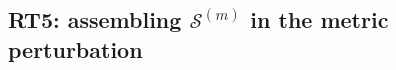 %

\subsection*{RT5: assembling \texorpdfstring{$\mathcal{S}^{(m)}$}{S(m)} in the metric perturbation}

%
%

